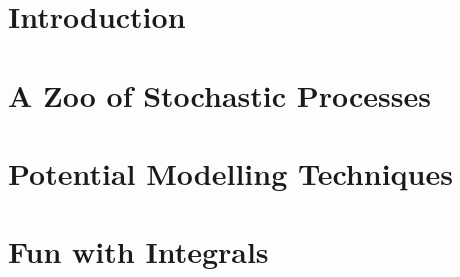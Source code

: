 \documentclass{report}
\begin{document}


\tableofcontents

\chapter{Introduction}



\chapter{A Zoo of Stochastic Processes}\label{zoo}



\chapter{Potential Modelling Techniques}\label{techniques}



\appendix
\chapter{Fun with Integrals}\label{fun}


\end{document}
